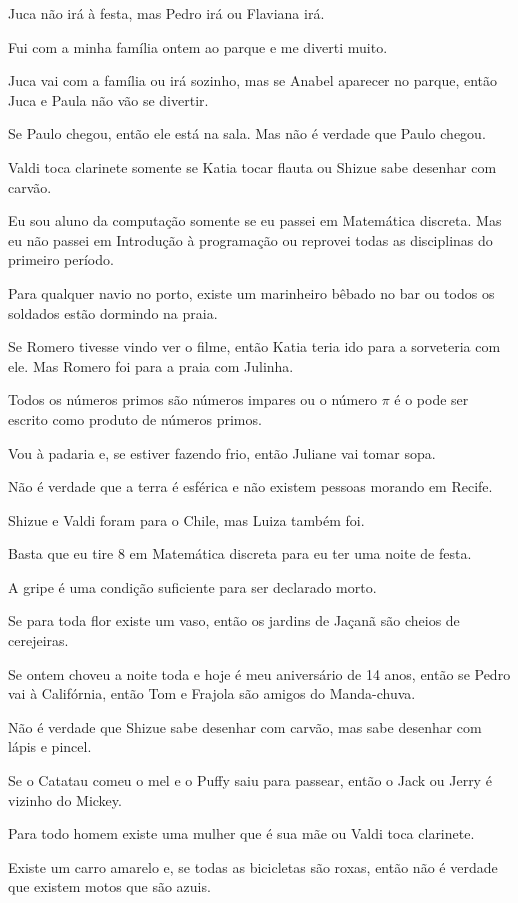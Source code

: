 \begin{exerList}
 \item Juca não irá à festa, mas Pedro irá ou Flaviana irá.
 \item Fui com a minha família ontem ao parque e me diverti muito.
 \item Juca vai com a família ou irá sozinho, mas se Anabel aparecer no parque, então Juca e Paula não vão se divertir.
 \item Se Paulo chegou, então ele está na sala. Mas não é verdade que Paulo chegou.
 \item Valdi toca clarinete somente se Katia tocar flauta ou Shizue sabe desenhar com carvão.
 \item Eu sou aluno da computação somente se eu passei em Matemática discreta. Mas eu não passei em Introdução à programação ou reprovei todas as disciplinas do primeiro período.
 \item Para qualquer navio no porto, existe um marinheiro bêbado no bar ou todos os soldados estão dormindo na praia.
 \item Se Romero tivesse vindo ver o filme, então Katia teria ido para a sorveteria com ele. Mas Romero foi para a praia com Julinha.
 \item Todos os números primos são números impares ou o número $\pi$ é o pode ser escrito como produto de números primos.
 \item Vou à padaria e, se estiver fazendo frio, então Juliane vai tomar sopa.
 \item Não é verdade que a terra é esférica e não existem pessoas morando em Recife.
 \item Shizue e Valdi foram para o Chile, mas Luiza também foi.
 \item Basta que eu tire 8 em Matemática discreta para eu ter uma noite de festa.
 \item A gripe é uma condição suficiente para ser declarado morto.
 \item Se para toda flor existe um vaso, então os jardins de Jaçanã são cheios de cerejeiras.
 \item Se ontem choveu a noite toda e hoje é meu aniversário de 14 anos, então se Pedro vai à Califórnia, então Tom e Frajola são amigos do Manda-chuva.
 \item Não é verdade que Shizue sabe desenhar com carvão, mas sabe desenhar com lápis e pincel.
 \item Se o Catatau comeu o mel e o Puffy saiu para passear, então o Jack ou Jerry é vizinho do Mickey.
 \item Para todo homem existe uma mulher que é sua mãe ou Valdi toca clarinete.
 \item Existe um carro amarelo e, se todas as bicicletas são roxas, então não é verdade que existem motos que são azuis.
\end{exerList}










